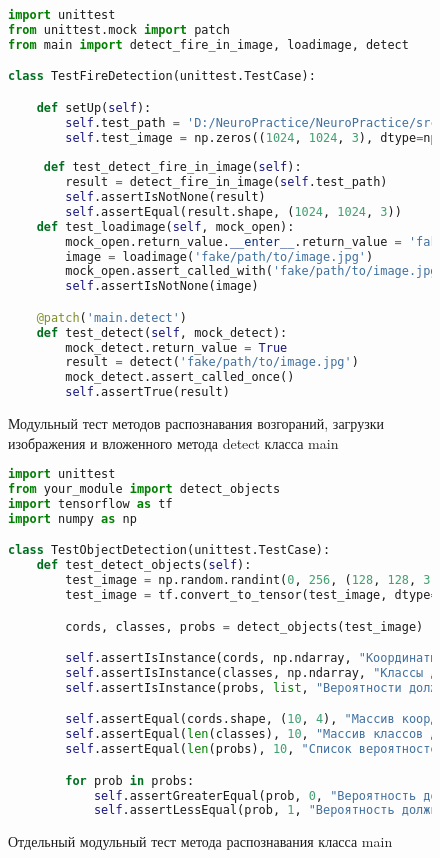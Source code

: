 \begin{figure}[H]
\begin{lstlisting}[language=Python]
import unittest
from unittest.mock import patch
from main import detect_fire_in_image, loadimage, detect

class TestFireDetection(unittest.TestCase):

    def setUp(self):
        self.test_path = 'D:/NeuroPractice/NeuroPractice/src/images/fire1.jpg'
        self.test_image = np.zeros((1024, 1024, 3), dtype=np.uint8)
        
     def test_detect_fire_in_image(self):
        result = detect_fire_in_image(self.test_path)
        self.assertIsNotNone(result)
        self.assertEqual(result.shape, (1024, 1024, 3))
    def test_loadimage(self, mock_open):
        mock_open.return_value.__enter__.return_value = 'fake file content'
        image = loadimage('fake/path/to/image.jpg')
        mock_open.assert_called_with('fake/path/to/image.jpg', 'rb')
        self.assertIsNotNone(image)

    @patch('main.detect')
    def test_detect(self, mock_detect):
        mock_detect.return_value = True
        result = detect('fake/path/to/image.jpg')
        mock_detect.assert_called_once()
        self.assertTrue(result)
\end{lstlisting}  
\caption{Модульный тест методов распознавания возгораний, загрузки изображения и вложенного метода detect класса main}
\label{test2:image}
\end{figure}

\begin{figure}[H]
\begin{lstlisting}[language=Python]
import unittest
from your_module import detect_objects
import tensorflow as tf
import numpy as np

class TestObjectDetection(unittest.TestCase):
    def test_detect_objects(self):
        test_image = np.random.randint(0, 256, (128, 128, 3), dtype=np.uint8)
        test_image = tf.convert_to_tensor(test_image, dtype=tf.float32)

        cords, classes, probs = detect_objects(test_image)

        self.assertIsInstance(cords, np.ndarray, "Координаты должны быть массивом NumPy")
        self.assertIsInstance(classes, np.ndarray, "Классы должны быть массивом NumPy")
        self.assertIsInstance(probs, list, "Вероятности должны быть списком")

        self.assertEqual(cords.shape, (10, 4), "Массив координат должен иметь форму (10, 4)")
        self.assertEqual(len(classes), 10, "Массив классов должен содержать 10 элементов")
        self.assertEqual(len(probs), 10, "Список вероятностей должен содержать 10 элементов")

        for prob in probs:
            self.assertGreaterEqual(prob, 0, "Вероятность должна быть больше или равна 0")
            self.assertLessEqual(prob, 1, "Вероятность должна быть меньше или равна 1")
\end{lstlisting}  
\caption{Отдельный модульный тест метода распознавания класса main}
\label{test3:image}
\end{figure}



